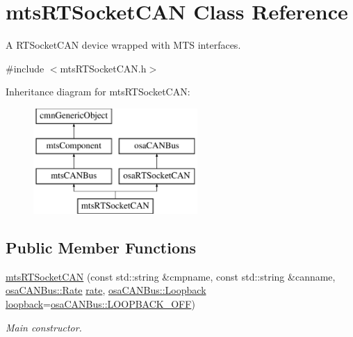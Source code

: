 \hypertarget{classmts_r_t_socket_c_a_n}{\section{mts\-R\-T\-Socket\-C\-A\-N Class Reference}
\label{classmts_r_t_socket_c_a_n}
}


A R\-T\-Socket\-C\-A\-N device wrapped with M\-T\-S interfaces.  




{\ttfamily \#include $<$mts\-R\-T\-Socket\-C\-A\-N.\-h$>$}

Inheritance diagram for mts\-R\-T\-Socket\-C\-A\-N\-:\begin{figure}[H]
\begin{center}
\leavevmode
\includegraphics[height=4.000000cm]{d9/d75/classmts_r_t_socket_c_a_n}
\end{center}
\end{figure}
\subsection*{Public Member Functions}
\begin{DoxyCompactItemize}
\item 
\hyperlink{classmts_r_t_socket_c_a_n_ab6b31f3a14e92e5e0a7985c8e7ba691a}{mts\-R\-T\-Socket\-C\-A\-N} (const std\-::string \&cmpname, const std\-::string \&canname, \hyperlink{classosa_c_a_n_bus_ae977dbc0e1c16772395408c8e018fe6c}{osa\-C\-A\-N\-Bus\-::\-Rate} \hyperlink{classosa_c_a_n_bus_a4ff86a9ecf19161b1f34666888e0a331}{rate}, \hyperlink{classosa_c_a_n_bus_a992406c83a336e95fb4a09b0b13df786}{osa\-C\-A\-N\-Bus\-::\-Loopback} \hyperlink{classosa_c_a_n_bus_a724e9c478dd48908882e29f189d98968}{loopback}=\hyperlink{classosa_c_a_n_bus_a992406c83a336e95fb4a09b0b13df786ae2557509d0c1ac68029eeb6bdf6e703d}{osa\-C\-A\-N\-Bus\-::\-L\-O\-O\-P\-B\-A\-C\-K\-\_\-\-O\-F\-F})
\begin{DoxyCompactList}\small\item\em Main constructor. \end{DoxyCompactList}\end{DoxyCompactItemize}
